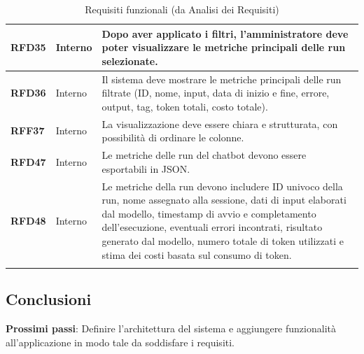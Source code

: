 \documentclass{article}
\begin{document}
\begin{longtable}{|>{\centering\arraybackslash}m{}|>{\centering\arraybackslash}m{}|>{\arraybackslash}m{}|}
    	\hline
    	\textbf{RFD35} & Interno 			& Dopo aver applicato i filtri, l’amministratore deve poter visualizzare le metriche principali delle run selezionate. \\
    	\hline
    	\textbf{RFD36} & Interno 			& Il sistema deve mostrare le metriche principali delle run filtrate (ID, nome, input, data di inizio e fine, errore, output, tag, token totali, costo totale). \\
    	\hline
    	\textbf{RFF37} & Interno 			& La visualizzazione deve essere chiara e strutturata, con possibilità di ordinare le colonne. \\
    	\hline
    	\textbf{RFD47} & Interno 			& Le metriche delle run del chatbot devono essere esportabili in JSON. \\
    	\hline
    	\textbf{RFD48} & Interno 			& Le metriche della run devono includere ID univoco della run, nome assegnato alla sessione, dati di input elaborati dal modello, timestamp di avvio e completamento dell'esecuzione, eventuali errori incontrati, risultato generato dal modello, numero totale di token utilizzati e stima dei costi basata sul consumo di token. \\
    	\hline
    	\caption{Requisiti funzionali (da Analisi dei Requisiti)}
    \end{longtable}
    



    \subsection*{Conclusioni}  %
    \textbf{Prossimi passi}: Definire l'architettura del sistema e aggiungere funzionalità all'applicazione in modo tale da soddisfare i requisiti.

\end{document}
